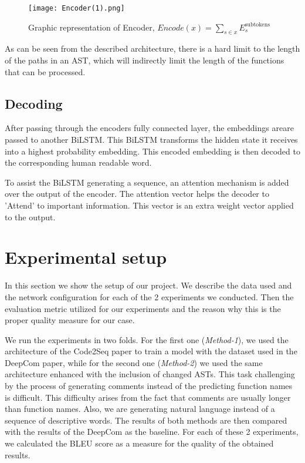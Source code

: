 \documentclass[a4paper,10pt]{article}
\theoremstyle{plain}
\theoremstyle{definition}
\begin{document}
\begin{multicols*}{2}
\begin{figure}[H]
    \centering
    \texttt{[image: Encoder(1).png]}
    \caption{Graphic representation of Encoder, $Encode(x) = \sum_{s\in x} E^{\text{subtokens}}_s$}
    \label{fig:encoder}
\end{figure}{}

As can be seen from the described architecture, there is a hard limit to the length of the paths in an AST, which will indirectly limit the length of the functions that can be processed. 

\subsection{Decoding}
\label{decoding}
After passing through the encoders fully connected layer, the embeddings areare passed to another BiLSTM. This BiLSTM transforms the hidden state it receives into a highest probability embedding. This encoded embedding is then decoded to the corresponding human readable word.

To assist the BiLSTM generating a sequence, an attention mechanism is added over the output of the encoder. The attention vector helps the decoder to 'Attend' to important information. This vector is an extra weight vector applied to the output\cite{attentionisallyouneed}.

\section{Experimental setup}
\label{setup}

In this section we show the setup of our project. We describe the data used and the network configuration for each of the 2 experiments we conducted. Then the evaluation metric utilized for our experiments  and the reason why this is the proper quality measure for our case.

We run the experiments in two folds. For the first one (\textit{Method-1}), we used the architecture of the Code2Seq paper to train a model with the dataset used in the DeepCom paper, while for the second one (\textit{Method-2}) we used the same architecture enhanced with the inclusion of changed ASTs. This task challenging by the process of generating comments instead of the predicting function names is difficult. This difficulty arises from the fact that comments are usually longer than function names. Also, we are generating natural language instead of a sequence of descriptive words. The results of both methods are then compared with the results of the DeepCom\cite{hu2018deep} as the baseline. For each of these 2 experiments, we calculated the BLEU score as a measure for the quality of the obtained results.



\end{multicols*}
\end{document}
